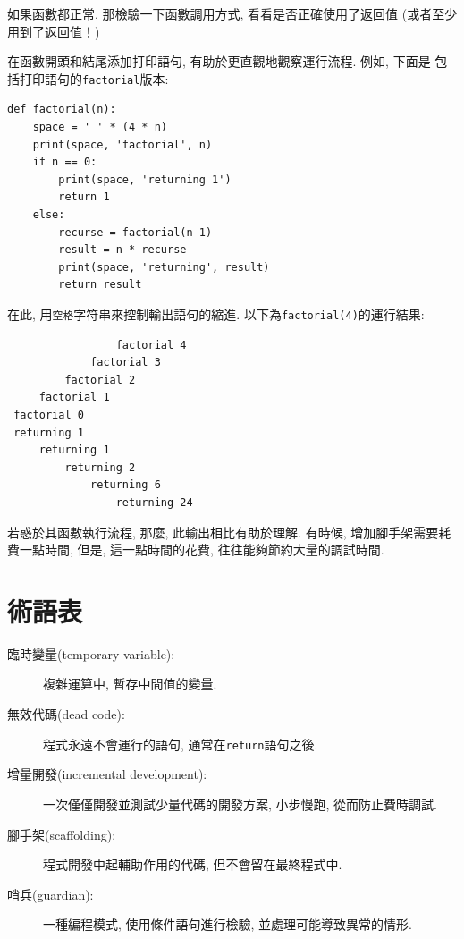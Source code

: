 \documentclass[10pt]{book}
\begin{document}
如果函數都正常, 那檢驗一下函數調用方式, 看看是否正確使用了返回值
(或者至少用到了返回值！)

在函數開頭和結尾添加打印語句, 有助於更直觀地觀察運行流程. 例如, 下面是
包括打印語句的{\tt factorial}版本:

\begin{verbatim}
def factorial(n):
    space = ' ' * (4 * n)
    print(space, 'factorial', n)
    if n == 0:
        print(space, 'returning 1')
        return 1
    else:
        recurse = factorial(n-1)
        result = n * recurse
        print(space, 'returning', result)
        return result
\end{verbatim}
%
在此, 用{\tt 空格}字符串來控制輸出語句的縮進. 以下為{\tt factorial(4)}的運行結果:

\begin{verbatim}
                 factorial 4
             factorial 3
         factorial 2
     factorial 1
 factorial 0
 returning 1
     returning 1
         returning 2
             returning 6
                 returning 24
\end{verbatim}
%
若惑於其函數執行流程, 那麼, 此輸出相比有助於理解. 
有時候, 增加腳手架需要耗費一點時間, 
但是, 這一點時間的花費, 往往能夠節約大量的調試時間. 

\section{術語表}

\begin{description}

\item[臨時變量(temporary variable):] 複雜運算中, 暫存中間值的變量. 

\item[無效代碼(dead code):]  程式永遠不會運行的語句, 通常在{\tt return}語句之後. 

\item[增量開發(incremental development):]  一次僅僅開發並測試少量代碼的開發方案, 
小步慢跑, 從而防止費時調試. 

\item[腳手架(scaffolding):]  程式開發中起輔助作用的代碼, 但不會留在最終程式中. 

\item[哨兵(guardian):]  一種編程模式, 使用條件語句進行檢驗, 並處理可能導致異常的情形. 

\end{description}
\end{document}
